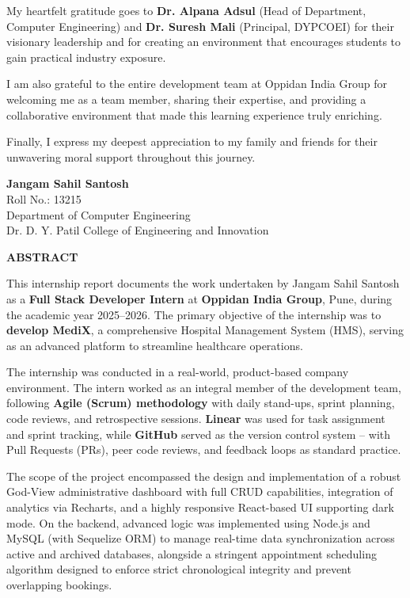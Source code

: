 \documentclass[12pt,a4paper]{article}
\begin{document}
My heartfelt gratitude goes to \textbf{Dr. Alpana Adsul} (Head of Department, Computer Engineering) and \textbf{Dr. Suresh Mali} (Principal, DYPCOEI) for their visionary leadership and for creating an environment that encourages students to gain practical industry exposure.

I am also grateful to the entire development team at Oppidan India Group for welcoming me as a team member, sharing their expertise, and providing a collaborative environment that made this learning experience truly enriching.

Finally, I express my deepest appreciation to my family and friends for their unwavering moral support throughout this journey.

\vspace{2cm}
\noindent\textbf{Jangam Sahil Santosh}\\
Roll No.: 13215\\
Department of Computer Engineering\\
Dr. D. Y. Patil College of Engineering and Innovation

\newpage
\begin{center}
    {\Large\textbf{ABSTRACT}}
\end{center}
\vspace{0.5in}

This internship report documents the work undertaken by Jangam Sahil Santosh as a \textbf{Full Stack Developer Intern} at \textbf{Oppidan India Group}, Pune, during the academic year 2025--2026. The primary objective of the internship was to \textbf{develop MediX}, a comprehensive Hospital Management System (HMS), serving as an advanced platform to streamline healthcare operations.

The internship was conducted in a real-world, product-based company environment. The intern worked as an integral member of the development team, following \textbf{Agile (Scrum) methodology} with daily stand-ups, sprint planning, code reviews, and retrospective sessions. \textbf{Linear} was used for task assignment and sprint tracking, while \textbf{GitHub} served as the version control system -- with Pull Requests (PRs), peer code reviews, and feedback loops as standard practice.

The scope of the project encompassed the design and implementation of a robust God-View administrative dashboard with full CRUD capabilities, integration of analytics via Recharts, and a highly responsive React-based UI supporting dark mode. On the backend, advanced logic was implemented using Node.js and MySQL (with Sequelize ORM) to manage real-time data synchronization across active and archived databases, alongside a stringent appointment scheduling algorithm designed to enforce strict chronological integrity and prevent overlapping bookings.
\end{document}

